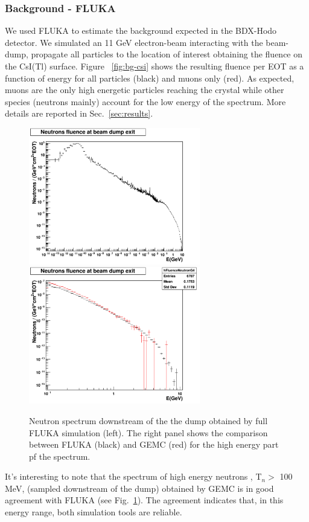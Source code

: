 \subsubsection{Background - FLUKA} 
We used FLUKA to estimate the background expected in the BDX-Hodo detector.
We simulated an 11 GeV electron-beam interacting with the beam-dump, propagate all particles to the location of interest obtaining the fluence on the CsI(Tl) surface.
Figure ~\ref{fig:bg-csi} shows the resulting fluence per EOT as a function of energy  for all particles (black) and muons only (red).
As expected,  muons are the only high energetic  particles reaching  the crystal while other species (neutrons mainly) account for the low energy of the spectrum. More details are reported in Sec.~\ref{sec:results}.
\begin{figure}[h!] 
\center
\includegraphics[width=7.5cm]{figs/NeutronsDump_1D.pdf}    
\includegraphics[width=7.5cm]{figs/NeutronsDumpComparison_1D.pdf}   
\caption{Neutron spectrum downstream of the the dump obtained by full FLUKA simulation (left). The right panel shows  the comparison between FLUKA (black) and GEMC (red) for the high energy part pf the spectrum.}
\label{fig:n-comp}
\end{figure}
It's interesting to note that the spectrum of  high energy neutrons , T$_n>$ 100 MeV,  (sampled downstream of the dump)  obtained by GEMC is in good agreement with FLUKA (see Fig.~\ref{fig:n-comp}). The agreement indicates  that, in this energy range, both simulation tools are reliable. 
